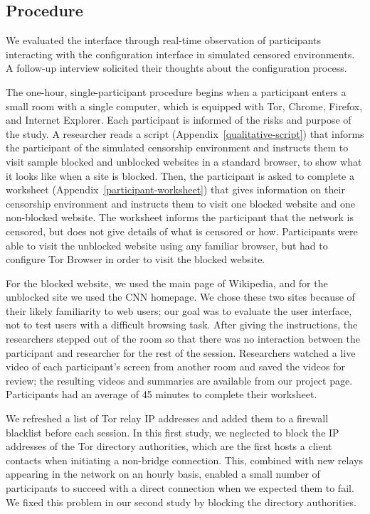 \documentclass[USenglish,oneside,twocolumn]{article}
\begin{document}
\subsection{Procedure}
We evaluated the interface through real-time observation of 
participants interacting with the configuration interface in simulated censored environments.
A follow-up interview 
solicited their thoughts about the configuration process.

The one-hour, single-participant procedure begins when a participant enters a small 
room with a single computer, which is equipped with Tor, Chrome, Firefox, and Internet Explorer.
Each participant is informed of 
the risks and purpose of the study.
A researcher reads a script (Appendix~\ref{qualitative-script}) that 
informs the participant of the simulated censorship environment and
instructs them to visit sample blocked and unblocked websites
in a standard browser, to show what it looks like when a site is blocked.
Then, the participant is asked to 
complete a worksheet (Appendix~\ref{participant-worksheet}) that gives information
on their censorship environment and instructs them
to visit one blocked website and one non-blocked website.
The worksheet informs the participant that the network is censored,
but does not give details of what is censored or how.
Participants were able to visit the unblocked website using any familiar browser,
but had to configure Tor Browser in order to visit the blocked website.
 
For the blocked website, we used the main page of Wikipedia,
and for the unblocked site we used the CNN homepage.
We chose these two sites because of their likely familiarity to web users;
our goal was to evaluate the user interface,
not to test users with a difficult browsing task.
After giving the instructions,
the researchers stepped out of the room so that there was no interaction
between the participant and researcher for the rest of the session.
Researchers watched a live video of each participant's screen from another room
and saved the videos for review; the resulting videos and summaries
are available from our project page.
Participants had an 
average of 45 minutes to complete their worksheet. 

We refreshed a list of Tor relay IP addresses and added them
to a firewall blacklist before each session.
In this first study, we neglected to block the IP addresses
of the Tor directory authorities, which are the first hosts
a client contacts when initiating a non-bridge connection.
This, combined with new relays appearing in the network on an hourly basis,
enabled a small number of participants to succeed with
a direct connection when we expected them to fail.
We fixed this problem in our second study by blocking the directory authorities.
\end{document}
